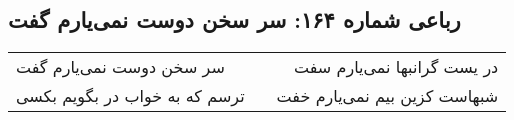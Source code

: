 \begin{center}
\section*{رباعی شماره ۱۶۴: سر سخن دوست نمی‌یارم گفت}
\label{sec:sh164}
\begin{longtable}{l p{0.5cm} r}
سر سخن دوست نمی‌یارم گفت
&&
در یست گرانبها نمی‌یارم سفت
\\
ترسم که به خواب در بگویم بکسی
&&
شبهاست کزین بیم نمی‌یارم خفت
\\
\end{longtable}
\end{center}
